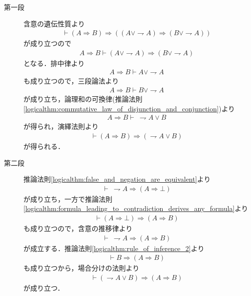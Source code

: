 	\begin{prf}\mbox{}
		\begin{description}
			\item[第一段]
				含意の遺伝性質より
				\begin{align}
					\vdash (A \Longrightarrow B) \Longrightarrow 
					((A \vee \rightharpoondown A) \Longrightarrow (B \vee \rightharpoondown A))
				\end{align}
				が成り立つので
				\begin{align}
					A \Longrightarrow B \vdash (A \vee \rightharpoondown A) \Longrightarrow (B \vee \rightharpoondown A)
				\end{align}
				となる．排中律より
				\begin{align}
					A \Longrightarrow B \vdash A \vee \rightharpoondown A
				\end{align}
				も成り立つので，三段論法より
				\begin{align}
					A \Longrightarrow B \vdash B \vee \rightharpoondown A
				\end{align}
				が成り立ち，論理和の可換律(推論法則\ref{logicalthm:commutative_law_of_disjunction_and_conjunction})より
				\begin{align}
					A \Longrightarrow B \vdash\ \rightharpoondown A \vee B
				\end{align}
				が得られ，演繹法則より
				\begin{align}
					\vdash (A \Longrightarrow B) \Longrightarrow (\rightharpoondown A \vee B)
				\end{align}
				が得られる．
				
			\item[第二段]
				推論法則\ref{logicalthm:false_and_negation_are_equivalent}より
				\begin{align}
					\vdash\ \rightharpoondown A \Longrightarrow (A \Longrightarrow \bot)
				\end{align}
				が成り立ち，一方で推論法則\ref{logicalthm:formula_leading_to_contradiction_derives_any_formula}より
				\begin{align}
					\vdash (A \Longrightarrow \bot) \Longrightarrow (A \Longrightarrow B)
				\end{align}
				も成り立つので，含意の推移律より
				\begin{align}
					\vdash\ \rightharpoondown A \Longrightarrow (A \Longrightarrow B)
				\end{align}
				が成立する．推論法則\ref{logicalthm:rule_of_inference_2}より
				\begin{align}
					\vdash B \Longrightarrow (A \Longrightarrow B)
				\end{align}
				も成り立つから，場合分けの法則より
				\begin{align}
					\vdash (\rightharpoondown A \vee B) \Longrightarrow (A \Longrightarrow B)
				\end{align}
				が成り立つ．
				\QED
		\end{description}
	\end{prf}
	
